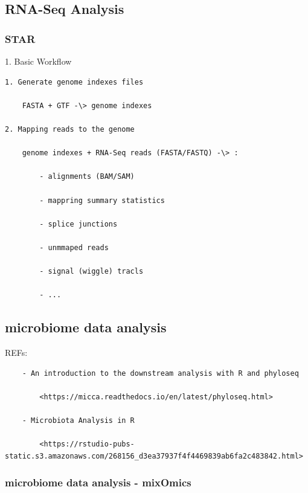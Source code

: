 \documentclass[
]{book}
\begin{document}
\hypertarget{rna-seq-analysis}{%
\subsection{RNA-Seq Analysis}\label{rna-seq-analysis}}

\hypertarget{star}{%
\subsubsection{STAR}\label{star}}

1. Basic Workflow

\begin{verbatim}
1. Generate genome indexes files

    FASTA + GTF -\> genome indexes

2. Mapping reads to the genome

    genome indexes + RNA-Seq reads (FASTA/FASTQ) -\> :

        - alignments (BAM/SAM)

        - mappring summary statistics

        - splice junctions

        - unmmaped reads

        - signal (wiggle) tracls

        - ...
\end{verbatim}

\hypertarget{microbiome-data-analysis}{%
\subsection{microbiome data analysis}\label{microbiome-data-analysis}}

REFs:

\begin{verbatim}
    - An introduction to the downstream analysis with R and phyloseq

        <https://micca.readthedocs.io/en/latest/phyloseq.html>

    - Microbiota Analysis in R

        <https://rstudio-pubs-static.s3.amazonaws.com/268156_d3ea37937f4f4469839ab6fa2c483842.html>
\end{verbatim}

\hypertarget{microbiome-data-analysis---mixomics}{%
\subsubsection{microbiome data analysis - mixOmics}\label{microbiome-data-analysis---mixomics}}
\end{document}
